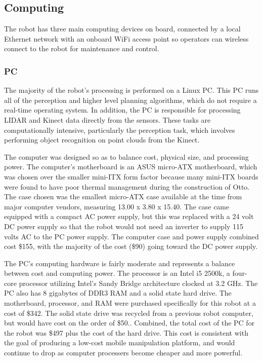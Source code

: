 \documentclass{article}
\begin{document}
\subsection[Computing]{Computing}
The robot has three main computing devices on board, connected by a local Ethernet network with an onboard WiFi access point so operators can wireless connect to the robot for maintenance and control.

\subsubsection[PC]{PC}
The majority of the robot{\textquoteright}s processing is performed on a Linux PC. This PC runs all of the perception and higher level planning algorithms, which do not require a real-time operating system. In addition, the PC is responsible for processing LIDAR and Kinect data directly from the sensors. These tasks are computationally intensive, particularly the perception task, which involves performing object recognition on point clouds from the Kinect.

The computer was designed so as to balance cost, physical size, and processing power. The computer{\textquoteright}s motherboard is an ASUS micro-ATX motherboard, which was chosen over the smaller mini-ITX form factor because many mini-ITX boards were found to have poor thermal management during the construction of Otto. The case chosen was the smallest micro-ATX case available at the time from major computer vendors, measuring 13.00{\textquotedbl} x 3.80{\textquotedbl} x 15.40{\textquotedbl}. The case came equipped with a compact AC power supply, but this was replaced with a 24 volt DC power supply so that the robot would not need an inverter to supply 115 volts AC to the PC power supply. The computer case and power supply combined cost \$155, with the majority of the cost (\$90) going toward the DC power supply.

The PC{\textquoteright}s computing hardware is fairly moderate and represents a balance between cost and computing power. The processor is an Intel i5 2500k, a four-core processor utilizing Intel{\textquoteright}s Sandy Bridge architecture clocked at 3.2 GHz. The PC also has 8 gigabytes of DDR3 RAM and a solid state hard drive. The motherboard, processor, and RAM were purchased specifically for this robot at a cost of \$342. The solid state drive was recycled from a previous robot computer, but would have cost on the order of \$50.. Combined, the total cost of the PC for the robot was \$497 plus the cost of the hard drive. This cost is consistent with the goal of producing a low-cost mobile manipulation platform, and would continue to drop as computer processers become cheaper and more powerful.
\end{document}
